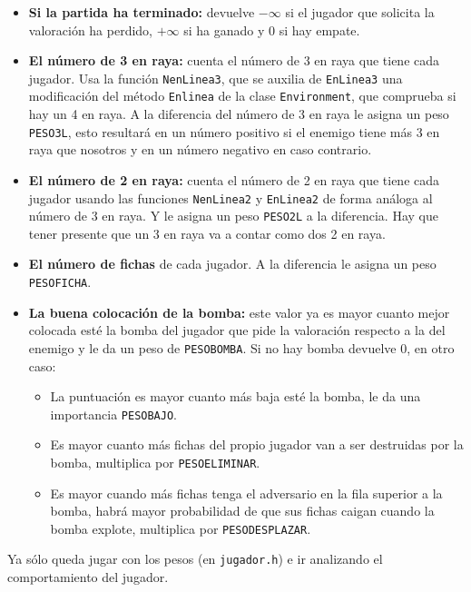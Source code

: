 \documentclass{article}
\begin{document}
\begin{itemize}
\item \textbf{Si la partida ha terminado:} devuelve $-\infty$ si el
  jugador que solicita la valoración ha perdido, $+\infty$ si ha
  ganado y 0 si hay empate.

\item \textbf{El número de 3 en raya:} cuenta el número de 3 en raya
  que tiene cada jugador. Usa la función \texttt{NenLinea3}, que se
  auxilia de \texttt{EnLinea3} una modificación del método
  \texttt{Enlinea} de la clase \texttt{Environment}, que comprueba si
  hay un 4 en raya. A la diferencia del número de 3 en raya le asigna
  un peso \texttt{PESO3L}, esto resultará en un número positivo si
  el enemigo tiene más 3 en raya que nosotros y en un número negativo
  en caso contrario.

\item \textbf{El número de 2 en raya:} cuenta el número de 2 en raya
  que tiene cada jugador usando las funciones \texttt{NenLinea2} y
  \texttt{EnLinea2} de forma análoga al número de 3 en raya. Y le
  asigna un peso \texttt{PESO2L} a la diferencia. Hay que tener
  presente que un 3 en raya va a contar como dos 2 en raya.

\item \textbf{El número de fichas} de cada jugador. A la diferencia le
  asigna un peso \texttt{PESOFICHA}.

\item \textbf{La buena colocación de la bomba:} este valor ya es mayor
  cuanto mejor colocada esté la bomba del jugador que pide la
  valoración respecto a la del enemigo y le da un peso de
  \texttt{PESOBOMBA}. Si no hay bomba devuelve 0, en otro caso:
  \begin{itemize}
  \item La puntuación es mayor cuanto más baja esté la bomba, le da
    una importancia \texttt{PESOBAJO}.
  \item Es mayor cuanto más fichas del propio jugador van a ser
    destruidas por la bomba, multiplica por \texttt{PESOELIMINAR}.
  \item Es mayor cuando más fichas tenga el adversario en la fila
    superior a la bomba, habrá mayor probabilidad de que sus fichas
    caigan cuando la bomba explote, multiplica por
    \texttt{PESODESPLAZAR}.
  \end{itemize}
\end{itemize}

Ya sólo queda jugar con los pesos (en \texttt{jugador.h}) e ir
analizando el comportamiento del jugador.
\end{document}

